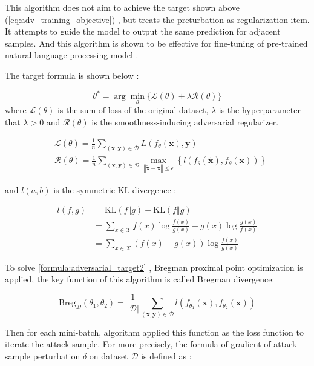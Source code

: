 \documentclass[10pt,twocolumn,letterpaper]{article}
\begin{document}
This algorithm does not aim to achieve the target shown above (\cref{eq:adv_training_objective}) , but treats the preturbation as regularization item. It attempts to guide the model to output the same prediction for adjacent samples. And this algorithm is shown to be effective for fine-tuning of pre-trained natural language processing model \cite{Jiang_2020} .

The target formula is shown below :

\begin{equation}
  \theta^*=\arg\min_\theta\{\mathcal{L}(\theta)+\lambda \mathcal{R}(\theta)\}
  \tag{2:4:1}
  \label{formula:adversarial_target2}
\end{equation}
where $\mathcal{L}(\theta)$ is the sum of loss of the original dataset, $\lambda$ is the hyperparameter that $\lambda>0$ and $\mathcal{R}(\theta)$ is the smoothness-inducing adversarial regularizer.

$$
\begin{aligned}
  &\mathcal{L}(\theta)=\frac{1}{n}\sum_{(\mathbf{x}, \mathbf{y})\in\mathcal{D}} L(f_\theta(\mathbf{x}), \mathbf{y}) \\
  &\mathcal{R}(\theta)=\frac{1}{n}\sum_{(\mathbf{x}, \mathbf{y})\in\mathcal{D}} \max_{\left\Vert \tilde{\mathbf{x}}-\mathbf{x}\right\Vert\leq \epsilon}\left\{l\left(f_\theta(\tilde{\mathbf{x}}), f_\theta(\mathbf{x})\right)\right\}
\end{aligned}
$$

and $l(a, b)$ is the symmetric KL divergence :

$$
\begin{aligned}
l(f, g)&=\mathrm{KL}(f\Vert g) + \mathrm{KL}(f\Vert g) \\
&=\sum_{x\in \mathcal{X}} f(x)\log\frac{f(x)}{g(x)} + g(x)\log\frac{g(x)}{f(x)} \\
&=\sum_{x\in \mathcal{X}} (f(x) - g(x))\log\frac{f(x)}{g(x)}
\end{aligned}
$$

To solve \cref{formula:adversarial_target2} , Bregman proximal point optimization is applied, the key function of this algorithm is called Bregman divergence: 

$$
\mathrm{Breg}_\mathcal{D}(\theta_1, \theta_2)=\frac{1}{\left\vert\mathcal{D}\right\vert}
  \sum_{(\mathbf{x}, \mathbf{y})\in\mathcal{D}}l\left(f_{\theta_1}(\mathbf{x}), f_{\theta_2}(\mathbf{x})\right)
$$

Then for each mini-batch, algorithm applied this function as the loss function to iterate the attack sample. For more precisely, the formula of gradient of attack sample perturbation $\delta$ on dataset $\mathcal{D}$ is defined as :
\end{document}
